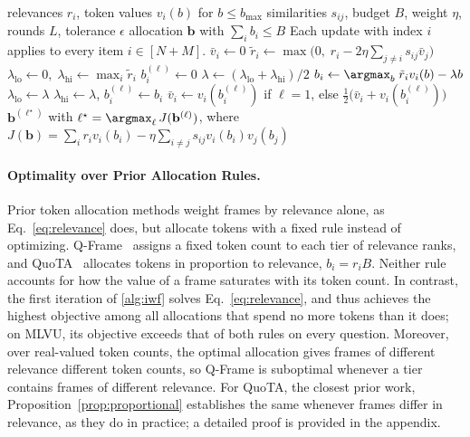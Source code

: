 \begin{algorithm}[t]
\caption{Iterative Water-Filling Token Allocation}
\label{alg:iwf}
\small
\begin{algorithmic}[1]
\Require relevances $r_i$, token values $v_i(b)$ for $b\le b_{\max}$
\Require similarities $s_{ij}$, budget $B$, weight $\eta$, rounds $L$, tolerance $\epsilon$
\Ensure allocation $\mathbf{b}$ with $\sum_i b_i\le B$
\Statex Each update with index $i$ applies to every item $i\in[N+M]$.
\State $\bar v_i\gets 0$ 
  \State $\tilde r_i\gets\max\!\big(0,\;r_i-2\eta\textstyle\sum_{j\ne i}s_{ij}\bar v_j\big)$ 
  \State $\lambda_{\mathrm{lo}}\gets 0,\;\lambda_{\mathrm{hi}}\gets\max_i\tilde r_i$ 
  \State $b_i^{(\ell)}\gets 0$ 
   
    \State $\lambda\gets(\lambda_{\mathrm{lo}}+\lambda_{\mathrm{hi}})/2$
    \State $b_i\gets\argmax_{b}\;\tilde r_iv_i(b)-\lambda b$ 
      \State $\lambda_{\mathrm{lo}}\gets\lambda$ 
    \Else
      \State $\lambda_{\mathrm{hi}}\gets\lambda$,\; $b_i^{(\ell)}\gets b_i$ 
    \EndIf
  \EndWhile
  \State $\bar v_i\gets v_i(b_i^{(\ell)})$ if $\ell=1$, else $\tfrac12\big(\bar v_i+v_i(b_i^{(\ell)})\big)$
\EndFor
\State \Return $\mathbf{b}^{(\ell^\star)}$ with $\ell^\star=\argmax_{\ell}\,J(\mathbf{b}^{(\ell)})$, where
\Statex \hspace{\algorithmicindent}$J(\mathbf{b})=\sum_i r_iv_i(b_i)-\eta\sum_{i\ne j}s_{ij}v_i(b_i)v_j(b_j)$
\end{algorithmic}
\end{algorithm}


\paragraph{Optimality over Prior Allocation Rules.}
Prior token allocation methods weight frames by relevance alone, as Eq.~\eqref{eq:relevance} does, but allocate tokens with a fixed rule instead of optimizing. Q-Frame~\cite{zhang2025qframe} assigns a fixed token count to each tier of relevance ranks, and QuoTA~\cite{luo2025quota} allocates tokens in proportion to relevance, $b_i=r_iB$. Neither rule accounts for how the value of a frame saturates with its token count. In contrast, the first iteration of \cref{alg:iwf} solves Eq.~\eqref{eq:relevance}, and thus achieves the highest objective among all allocations that spend no more tokens than it does; on MLVU, its objective exceeds that of both rules on every question. Moreover, over real-valued token counts, the optimal allocation gives frames of different relevance different token counts, so Q-Frame is suboptimal whenever a tier contains frames of different relevance. For QuoTA, the closest prior work, Proposition~\ref{prop:proportional} establishes the same whenever frames differ in relevance, as they do in practice; a detailed proof is provided in the appendix.

